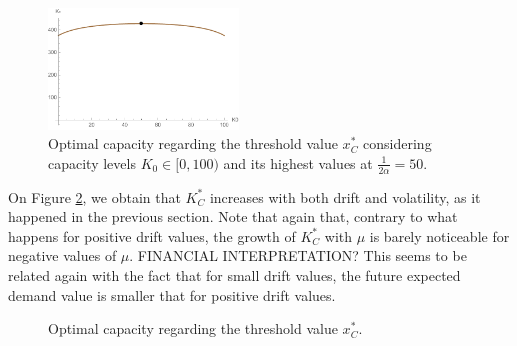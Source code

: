\begin{figure}[!htb]
	\centering
	\includegraphics[width=0.45\textwidth]{Prob2_CapOpt/koptx_k0.pdf}
	\caption{Optimal capacity regarding the threshold value $x^*_C$ considering capacity levels $K_0 \in [0, 100)$ and its highest values at $\frac{1}{2 \alpha}=50$.}
	\label{fig:2_k0}
\end{figure}

On Figure \ref{fig:2_k1}, we obtain that $K^*_C$ increases with both drift and volatility, as it happened in the previous section. Note that again that, contrary to what happens for positive drift values, the growth of $K^*_C$ with $\mu$ is barely noticeable for negative values of $\mu$. FINANCIAL INTERPRETATION? This seems to be related again with the fact that for small drift values, the future expected demand value is smaller that for positive drift values. 

\begin{figure}[!htb]
	\begin{subfigmatrix}{2}
	\end{subfigmatrix}
	\caption{Optimal capacity regarding the threshold value $x^*_C$.}
	\label{fig:2_k1}
\end{figure}

